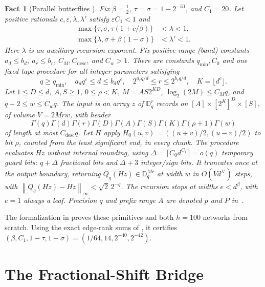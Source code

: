 \documentclass[11pt]{article}
\newtheorem{fact}[theorem]{Fact}
\theoremstyle{definition}
\renewcommand{\label}[1]{}%
\newcommand{\Disk}{\mathbb{D}}
\newcommand{\eps}{\varepsilon}
\newcommand{\norm}[1]{\left\lVert #1 \right\rVert}
\begin{document}
\begin{fact}[Parallel butterflies {\cite[Proposition~14]{OAI26}}]
\label{fact:butterfly}
Fix $\beta=\frac12$, $\tau=\sigma=1-2^{-50}$, and $C_1=20$.
Let positive rationals $c,\eps,\lambda,\lambda'$ satisfy $\eps C_1<1$ and
\begin{align}
 \max\{\tau,\sigma,\tau(1+c/\beta)\}&<\lambda<1,
       \label{eq:adm1}\\
 \max\{\lambda,\sigma+\beta(1-\sigma)\}&<\lambda'<1.
       \label{eq:adm2}
\end{align}
Here $\lambda$ is an auxiliary recursion exponent.
Fix positive range (band) constants $a_d\le b_d$, $a_r\le b_r$,
$C_M,C_{\mathrm{desc}}$, and $C_w>1$.
There are constants $q_{\min},C_0$ and one fixed-tape procedure for all
integer parameters satisfying
\begin{equation}\label{eq:bands}
 q\ge q_{\min},\quad a_dq^\eps\le d\le b_dq^\eps,\quad
 2^{a_rq/d}\le r\le2^{b_rq/d},\quad K=\lfloor d^c\rfloor.
\end{equation}
Let $1\le D\le d$, $A,S\ge1$, $0\le\rho<K$, $M=AS2^{KD}$,
$\log_2(2M)\le C_Mq$, and $q+2\le w\le C_wq$.
The input is an array $z$ of $\Disk_q^r$ records on
$[A]\times[2^K]^D\times[S]$, of volume $V=2Mrw$, with header
\[
 \Gamma(q)\Gamma(d)\Gamma(r)\Gamma(D)\Gamma(A)
 \Gamma(S)\Gamma(K)\Gamma(\rho+1)\Gamma(w)
\]
of length at most $C_{\mathrm{desc}}q$.
Let $H$ apply $H_0(u,v)=((u+v)/2,(u-v)/2)$ to bit $\rho$,
counted from the least significant end, in every chunk.
The procedure evaluates $Hz$ without internal rounding, using
$\Delta=\lceil C_0d^{C_1}\rceil=o(q)$ temporary guard bits:
$q+\Delta$ fractional bits and $\Delta+3$ integer/sign bits.
It truncates once at the output boundary, returning
$Q_q(Hz)\in\Disk_q^{Mr}$ at width $w$ in $O(Vd^{\lambda'})$ steps, with
$\norm{Q_q(Hz)-Hz}_\infty<\sqrt2\,2^{-q}$.
The recursion stops at widths $e<d^\beta$, with $e=1$ always a leaf.
Precision $q$ and prefix range $A$ are denoted $p$ and $P$ in~\cite{OAI26}.
\end{fact}

The formalization in  proves these primitives and both $h=100$
networks from scratch. Using the exact edge-rank sums of
\cite[Propositions~7--8]{OAI26}, it certifies
$(\beta,C_1,1-\tau,1-\sigma)=(1/64,14,2^{-40},2^{-42})$.

\section{The Fractional-Shift Bridge}\label{sec:bridge}
\end{document}
